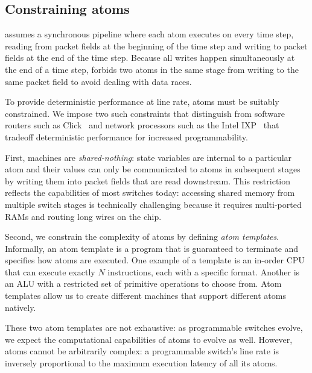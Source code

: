 \subsection{Constraining atoms}
\absmachine assumes a synchronous pipeline where each atom executes on every
time step, reading from packet fields at the beginning of the time step and
writing to packet fields at the end of the time step. Because all writes happen
simultaneously at the end of a time step, \absmachine forbids two atoms in the
same stage from writing to the same packet field to avoid dealing with data
races.

To provide deterministic performance at line rate, atoms must be suitably
constrained.  We impose two such constraints that distinguish \absmachine from
software routers such as Click~\cite{click} and network processors such as the
Intel IXP~\cite{ixp4xx} that tradeoff deterministic performance for
increased programmability.

First, \absmachine machines are \textit{shared-nothing}: state variables are
internal to a particular atom and their values can only be communicated to
atoms in subsequent stages by writing them into packet fields that are read
downstream.  This restriction reflects the capabilities of most switches today:
accessing shared memory from multiple switch stages is technically challenging
because it requires multi-ported RAMs and routing long wires on the chip.

Second, we constrain the complexity of atoms by defining {\it atom templates}.
Informally, an atom template is a program that is guaranteed to terminate and
specifies how atoms are executed. One example of a template is an in-order CPU
that can execute exactly $N$ instructions, each with a specific format. Another
is an ALU with a restricted set of primitive operations to choose from. Atom
templates allow us to create different \absmachine machines that support
different atoms natively.

These two atom templates are not exhaustive: as programmable switches evolve,
we expect the computational capabilities of atoms to evolve as well. However,
atoms cannot be arbitrarily complex: a programmable switch's line rate is
inversely proportional to the maximum execution latency of all its atoms.
